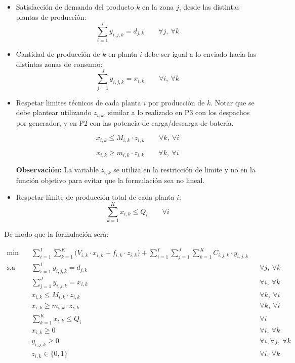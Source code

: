 \begin{itemize}
    \item[i)] Satisfacción de demanda del producto $k$ en la zona $j$, desde las distintas plantas de producción:
    \begin{equation}
    \sum_{i=1}^{I} y_{i,j,k} = d_{j,k}
    \qquad \forall j,\ \forall k
    \label{ex:2:4:eq:14}
    \end{equation}
    \item[ii)] Cantidad de producción de $k$ en planta $i$ debe ser igual a lo enviado hacia las distintas zonas de consumo:
    \begin{equation}
        \sum_{j=1}^{J} y_{i,j,k} = x_{i,k} \qquad \forall i,\ \forall k
    \end{equation}
    \item[iii)] Respetar limites técnicos de cada planta $i$ por producción de $k$. Notar que se debe plantear utilizando $z_{i,k}$, similar a lo realizado en P3 con los despachos por generador, y en P2 con las potencia de carga/descarga de batería.
    
    \begin{equation}
        x_{i,k} \leq M_{i,k} \cdot z_{i,k}
    \qquad \forall k,\ \forall i
    \end{equation}

    \begin{equation}
        x_{i,k} \geq m_{i,k} \cdot z_{i,k}
    \qquad \forall k,\ \forall i
    \end{equation}

    \textbf{Observación:} La variable $z_{i,k}$ se utiliza en la restricción de limite y no en la función objetivo para evitar que la formulación sea no lineal.

    \item[iv)] Respetar límite de producción total de cada planta $i$:
    \begin{equation}
        \sum_{k=1}^K x_{i,k} \leq Q_i
    \qquad \forall i
    \end{equation}
\end{itemize}

De modo que la formulación será:

\[
\begin{aligned}
\min \quad
& \sum_{i=1}^{I} \sum_{k=1}^{K} \big(V_{i,k} \cdot x_{i,k} +  f_{i,k} \cdot z_{i,k} \big)
+ \sum_{i=1}^{I} \sum_{j=1}^{J} \sum_{k=1}^{K} C_{i,j,k} \cdot y_{i,j,k} \\
\text{s.a} \quad
& \sum_{i=1}^{I} y_{i,j,k} = d_{j,k} && \forall j,\ \forall k \\
& \sum_{j=1}^{J} y_{i,j,k} = x_{i,k} && \forall i,\ \forall k \\
& x_{i,k} \leq M_{i,k} \cdot z_{i,k} && \forall k,\ \forall i \\
& x_{i,k} \geq m_{i,k} \cdot z_{i,k} && \forall k,\ \forall i \\
& \sum_{k=1}^K x_{i,k} \leq Q_i && \forall i \\
& x_{i,k} \geq 0 && \forall i,\ \forall k \\
& y_{i,j,k} \geq 0 && \forall i,\forall j ,\ \forall k \\
& z_{i,k} \in \{0,1\} && \forall i,\ \forall k
\end{aligned}
\]


